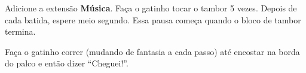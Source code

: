 \begin{exercicio}
Adicione a extensão \textbf{Música}. Faça o gatinho tocar o tambor 5 vezes. Depois de cada batida, espere meio segundo. Essa pausa começa quando o bloco de tambor termina.
\end{exercicio}

\begin{solucao}
\begin{pilha}
\sbcend
\end{pilha}
\end{solucao}

\begin{desafio}
Faça o gatinho correr (mudando de fantasia a cada passo) até encostar na borda do palco e então dizer ``Cheguei!''.
\end{desafio}

\begin{solucao}
\begin{pilha}
\sbcend
{}
\end{pilha}
\end{solucao}
